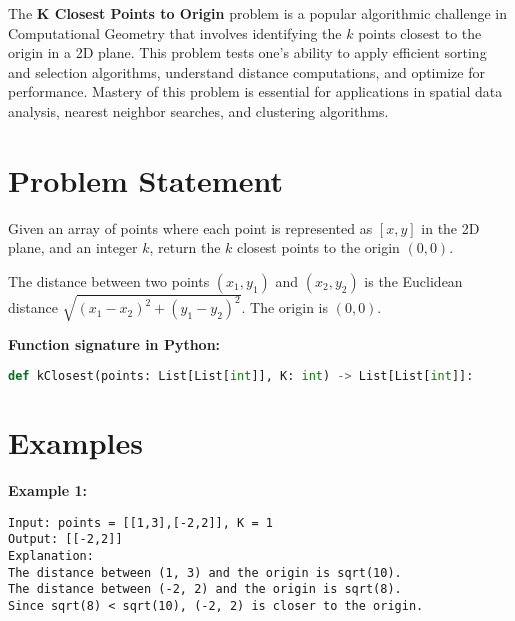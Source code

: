 
\label{chap:K_Closest_Points_to_Origin}

The \textbf{K Closest Points to Origin} problem is a popular algorithmic challenge in Computational Geometry that involves identifying the \(k\) points closest to the origin in a 2D plane. This problem tests one's ability to apply efficient sorting and selection algorithms, understand distance computations, and optimize for performance. Mastery of this problem is essential for applications in spatial data analysis, nearest neighbor searches, and clustering algorithms.

\section*{Problem Statement}

Given an array of points where each point is represented as \([x, y]\) in the 2D plane, and an integer \(k\), return the \(k\) closest points to the origin \((0, 0)\).

The distance between two points \((x_1, y_1)\) and \((x_2, y_2)\) is the Euclidean distance \(\sqrt{(x_1 - x_2)^2 + (y_1 - y_2)^2}\). The origin is \((0, 0)\).

\textbf{Function signature in Python:}
\begin{lstlisting}[language=Python]
def kClosest(points: List[List[int]], K: int) -> List[List[int]]:
\end{lstlisting}

\section*{Examples}

\textbf{Example 1:}

\begin{verbatim}
Input: points = [[1,3],[-2,2]], K = 1
Output: [[-2,2]]
Explanation: 
The distance between (1, 3) and the origin is sqrt(10).
The distance between (-2, 2) and the origin is sqrt(8).
Since sqrt(8) < sqrt(10), (-2, 2) is closer to the origin.
\end{verbatim}

